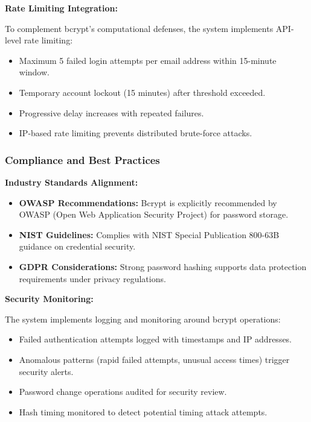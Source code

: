 \documentclass[12pt,a4paper]{article}
\begin{document}
\vspace{0.5em}

\textbf{Rate Limiting Integration:}

To complement bcrypt's computational defenses, the system implements API-level rate limiting:

\begin{itemize}[leftmargin=2em, itemsep=6pt]
    \item Maximum 5 failed login attempts per email address within 15-minute window.
    \item Temporary account lockout (15 minutes) after threshold exceeded.
    \item Progressive delay increases with repeated failures.
    \item IP-based rate limiting prevents distributed brute-force attacks.
\end{itemize}

\subsubsection{Compliance and Best Practices}

\textbf{Industry Standards Alignment:}

\begin{itemize}[leftmargin=2em, itemsep=6pt]
    \item \textbf{OWASP Recommendations:} Bcrypt is explicitly recommended by OWASP (Open Web Application Security Project) for password storage.
    \item \textbf{NIST Guidelines:} Complies with NIST Special Publication 800-63B guidance on credential security.
    \item \textbf{GDPR Considerations:} Strong password hashing supports data protection requirements under privacy regulations.
\end{itemize}

\vspace{0.5em}

\textbf{Security Monitoring:}

The system implements logging and monitoring around bcrypt operations:

\begin{itemize}[leftmargin=2em, itemsep=6pt]
    \item Failed authentication attempts logged with timestamps and IP addresses.
    \item Anomalous patterns (rapid failed attempts, unusual access times) trigger security alerts.
    \item Password change operations audited for security review.
    \item Hash timing monitored to detect potential timing attack attempts.
\end{itemize}
\end{document}

